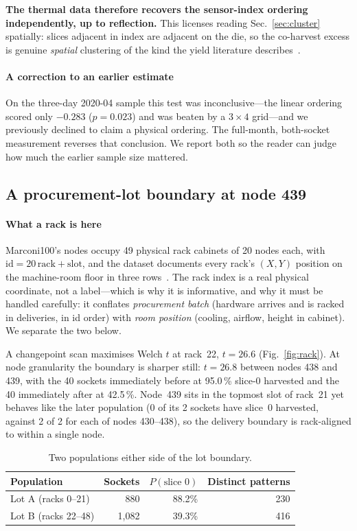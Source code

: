 \documentclass[10pt,conference]{IEEEtran}
\begin{document}
\textbf{The thermal data therefore recovers the sensor-index ordering independently, up to
reflection.} This licenses reading Sec.~\ref{sec:cluster} spatially: slices adjacent in index are
adjacent on the die, so the co-harvest excess is genuine \emph{spatial} clustering of the kind the
yield literature describes~\cite{koren1993negbinom,bae2007waferyield}.

\paragraph*{A correction to an earlier estimate} On the three-day 2020-04 sample this test was
inconclusive---the linear ordering scored only $-0.283$ ($p=0.023$) and was beaten by a $3\times4$
grid---and we previously declined to claim a physical ordering. The full-month, both-socket
measurement reverses that conclusion. We report both so the reader can judge how much the earlier
sample size mattered.

\subsection{A procurement-lot boundary at node 439}
\label{sec:lot}
\paragraph*{What a rack is here} Marconi100's nodes occupy 49 physical rack cabinets of 20 nodes
each, with $\mathrm{id}=20\,\mathrm{rack}+\mathrm{slot}$, and the dataset documents every rack's
$(X,Y)$ position on the machine-room floor in three rows~\cite{exadata_repo}. The rack index is a
real physical coordinate, not a label---which is why it is informative, and why it must be handled
carefully: it conflates \emph{procurement batch} (hardware arrives and is racked in deliveries, in
id order) with \emph{room position} (cooling, airflow, height in cabinet). We separate the two
below.

A changepoint scan maximises Welch $t$ at rack~22, $t=26.6$ (Fig.~\ref{fig:rack}). At node
granularity the boundary is sharper still: $t=26.8$ between nodes 438 and 439, with the 40 sockets
immediately before at 95.0\,\% slice-0 harvested and the 40 immediately after at 42.5\,\%.
Node~439 sits in the topmost slot of rack~21 yet behaves like the later population (0 of its 2
sockets have slice~0 harvested, against 2 of 2 for each of nodes 430--438), so the delivery
boundary is rack-aligned to within a single node.

\begin{table}[h]\centering\caption{Two populations either side of the lot boundary.}
\begin{tabular}{lrrr}\toprule
Population & Sockets & $P(\text{slice 0})$ & Distinct patterns\\\midrule
Lot A (racks 0--21) & 880 & 88.2\% & 230\\
Lot B (racks 22--48) & 1{,}082 & 39.3\% & 416\\
\bottomrule\end{tabular}\end{table}
\end{document}
